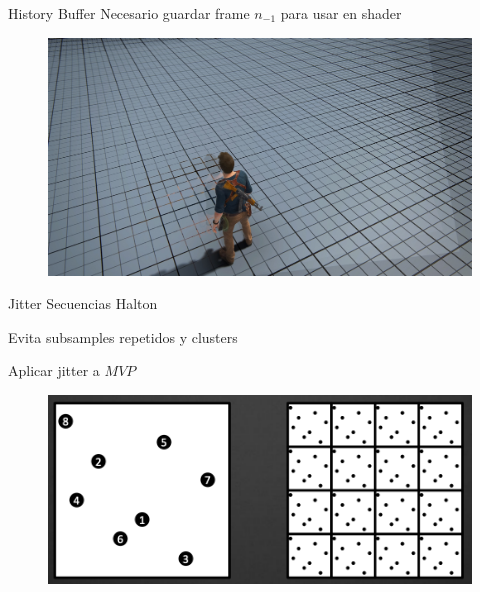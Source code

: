 \documentclass[table]{beamer}
\begin{document}
\begin{frame}[fragile]{History Buffer}
    Necesario guardar frame $n_{-1}$ para usar en shader

    \begin{figure}
        \includegraphics[width=\linewidth]{./figures/reprojection.png}
    \end{figure}
\end{frame}
\begin{frame}[fragile]{Jitter}
    Secuencias Halton

    Evita subsamples repetidos y clusters

    Aplicar jitter a $MVP$

    \begin{figure}
        \includegraphics[width=\linewidth]{./figures/halton.png}
    \end{figure}
\end{frame}
\end{document}
